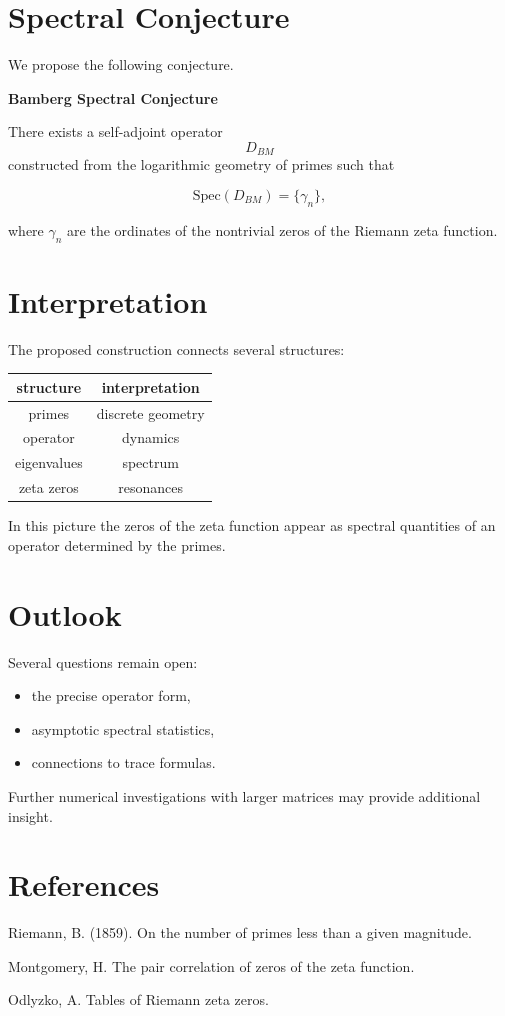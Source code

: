 \documentclass[11pt]{article}
\begin{document}
	\section{Spectral Conjecture}
	
	We propose the following conjecture.
	
	\textbf{Bamberg Spectral Conjecture}
	
	There exists a self-adjoint operator
	\[
	D_{BM}
	\]
	constructed from the logarithmic geometry of primes
	such that
	
	\[
	\mathrm{Spec}(D_{BM})
	=
	\{\gamma_n\},
	\]
	
	where $\gamma_n$ are the ordinates of the nontrivial
	zeros of the Riemann zeta function.
	
	\section{Interpretation}
	
	The proposed construction connects several structures:
	
	\begin{center}
		\begin{tabular}{c|c}
			structure & interpretation \\
			\hline
			primes & discrete geometry \\
			operator & dynamics \\
			eigenvalues & spectrum \\
			zeta zeros & resonances
		\end{tabular}
	\end{center}
	
	In this picture the zeros of the zeta function
	appear as spectral quantities of an operator
	determined by the primes.
	
	\section{Outlook}
	
	Several questions remain open:
	
	\begin{itemize}
		\item the precise operator form,
		\item asymptotic spectral statistics,
		\item connections to trace formulas.
	\end{itemize}
	
	Further numerical investigations with larger matrices
	may provide additional insight.
	
	\section*{References}
	
	Riemann, B. (1859).  
	On the number of primes less than a given magnitude.
	
	Montgomery, H.  
	The pair correlation of zeros of the zeta function.
	
	Odlyzko, A.  
	Tables of Riemann zeta zeros.
	
\end{document}
